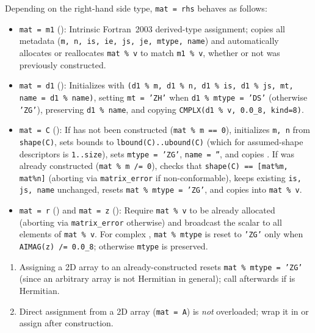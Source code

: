 Depending on the right-hand side type, \texttt{mat = rhs} behaves as follows:
\begin{itemize}
  \item \texttt{mat = m1} (): Intrinsic Fortran~2003 derived-type assignment; copies all metadata (\texttt{m, n, is, ie, js, je, mtype, name}) and automatically allocates or reallocates \texttt{mat \% v} to match \texttt{m1 \% v}, whether or not  was previously constructed.
  \item \texttt{mat = d1} (): Initializes  with \texttt{(d1 \% m, d1 \% n, d1 \% is, d1 \% js, mt, name = d1 \% name)}, setting \texttt{mt = 'ZH'} when \texttt{d1 \% mtype = 'DS'} (otherwise \texttt{'ZG'}), preserving \texttt{d1 \% name}, and copying \texttt{CMPLX(d1 \% v, 0.0\_8, kind=8)}.
  \item \texttt{mat = C} (): If  has not been constructed (\texttt{mat \% m == 0}), initializes \texttt{m, n} from \texttt{shape(C)}, sets bounds to \texttt{lbound(C)..ubound(C)} (which for assumed-shape descriptors is \texttt{1..size}), sets \texttt{mtype = 'ZG'}, \texttt{name = ''}, and copies . If  was already constructed (\texttt{mat \% m /= 0}), checks that \texttt{shape(C) == [mat\%m, mat\%n]} (aborting via \texttt{matrix\_error} if non-conformable), keeps existing \texttt{is, js, name} unchanged, resets \texttt{mat \% mtype = 'ZG'}, and copies  into \texttt{mat \% v}.
  \item \texttt{mat = r} () and \texttt{mat = z} (): Require \texttt{mat \% v} to be already allocated (aborting via \texttt{matrix\_error} otherwise) and broadcast the scalar to all elements of \texttt{mat \% v}. For complex , \texttt{mat \% mtype} is reset to \texttt{'ZG'} only when \texttt{AIMAG(z) /= 0.0\_8}; otherwise \texttt{mtype} is preserved.
\end{itemize}

\begin{warnbox}
\begin{enumerate}
  \item Assigning a 2D array  to an already-constructed  resets \texttt{mat \% mtype = 'ZG'} (since an arbitrary array is not Hermitian in general); call  afterwards if  is Hermitian.
  \item Direct assignment from a 2D  array (\texttt{mat = A}) is \emph{not} overloaded; wrap it in  or assign  after construction.
\end{enumerate}
\end{warnbox}

